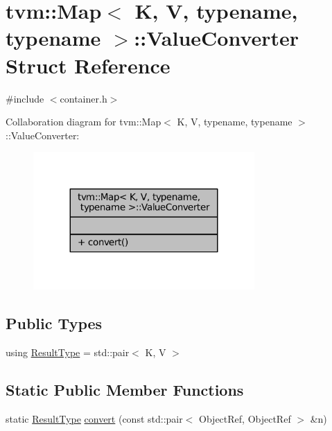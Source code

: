 \hypertarget{structtvm_1_1Map_1_1ValueConverter}{}\section{tvm\+:\+:Map$<$ K, V, typename, typename $>$\+:\+:Value\+Converter Struct Reference}
\label{structtvm_1_1Map_1_1ValueConverter}


{\ttfamily \#include $<$container.\+h$>$}



Collaboration diagram for tvm\+:\+:Map$<$ K, V, typename, typename $>$\+:\+:Value\+Converter\+:
\nopagebreak
\begin{figure}[H]
\begin{center}
\leavevmode
\includegraphics[width=239pt]{structtvm_1_1Map_1_1ValueConverter__coll__graph}
\end{center}
\end{figure}
\subsection*{Public Types}
\begin{DoxyCompactItemize}
\item 
using \hyperlink{structtvm_1_1Map_1_1ValueConverter_afd4a4c5a243014ccfebb48fb18ad8588}{Result\+Type} = std\+::pair$<$ K, V $>$
\end{DoxyCompactItemize}
\subsection*{Static Public Member Functions}
\begin{DoxyCompactItemize}
\item 
static \hyperlink{structtvm_1_1Map_1_1ValueConverter_afd4a4c5a243014ccfebb48fb18ad8588}{Result\+Type} \hyperlink{structtvm_1_1Map_1_1ValueConverter_a82c6961ccf2b833396ff8742506bd32a}{convert} (const std\+::pair$<$ Object\+Ref, Object\+Ref $>$ \&n)
\end{DoxyCompactItemize}


